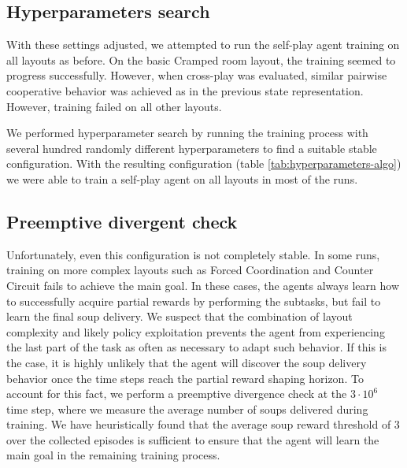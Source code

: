 \subsection*{Hyperparameters search}
With these settings adjusted, we attempted to run the self-play agent training on all layouts as before.
On the basic Cramped room layout, the training seemed to progress successfully.
However, when cross-play was evaluated, similar pairwise cooperative behavior was achieved as in the previous state representation.
However, training failed on all other layouts.

We performed hyperparameter search by running the training process with several hundred randomly different hyperparameters to find a suitable stable configuration.
With the resulting configuration (table \ref{tab:hyperparameters-algo}) we were able to train a self-play agent on all layouts in most of the runs.

\subsection*{Preemptive divergent check}
Unfortunately, even this configuration is not completely stable.
In some runs, training on more complex layouts such as Forced Coordination and Counter Circuit fails to achieve the main goal.
In these cases, the agents always learn how to successfully acquire partial rewards by performing the subtasks, but fail to learn the final soup delivery.
We suspect that the combination of layout complexity and likely policy exploitation prevents the agent from experiencing the last part of the task as often as necessary to adapt such behavior.
If this is the case, it is highly unlikely that the agent will discover the soup delivery behavior once the time steps reach the partial reward shaping horizon.
To account for this fact, we perform a preemptive divergence check at the $3\cdot10^6$ time step, where we measure the average number of soups delivered during training.
We have heuristically found that the average soup reward threshold of $3$ over the collected episodes is sufficient to ensure that the agent will learn the main goal in the remaining training process.


